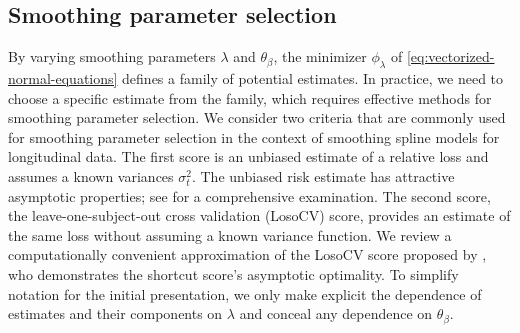 


\subsection{Smoothing parameter selection} \label{SSANOVA-smoothing-parameter-selection}
%
%

By varying smoothing parameters $\lambda$ and $\theta_\beta$, the minimizer $\phi_\lambda$ of \ref{eq:vectorized-normal-equations} defines a family of potential estimates. In practice, we need to choose a specific estimate from the family, which requires effective methods for smoothing parameter selection. We consider two criteria that are commonly used for smoothing parameter selection in the context of smoothing spline models for longitudinal data. The first score is an unbiased estimate of a relative loss and assumes a known variances $\sigma_t^2$. The unbiased risk estimate has attractive asymptotic properties; see \cite{gu2013smoothing} for a comprehensive examination. The second score, the leave-one-subject-out cross validation (LosoCV) score, provides an estimate of the same loss without assuming a known variance function. We review a computationally convenient approximation of the LosoCV score proposed by \cite{xu2012asymptotic}, who demonstrates the shortcut score's asymptotic optimality. To simplify notation for the initial presentation, we only make explicit the dependence of estimates and their components on $\lambda$ and conceal any dependence on $\theta_\beta$. 


